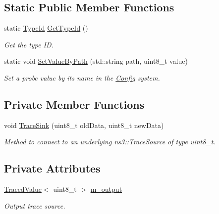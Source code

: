 \subsection*{Static Public Member Functions}
\begin{DoxyCompactItemize}
\item 
static \hyperlink{classns3_1_1TypeId}{Type\+Id} \hyperlink{classns3_1_1Uinteger8Probe_a514e92b16bae5c529857dbae57ec3142}{Get\+Type\+Id} ()
\begin{DoxyCompactList}\small\item\em Get the type ID. \end{DoxyCompactList}\item 
static void \hyperlink{classns3_1_1Uinteger8Probe_a5126f87223a1836fd0d63a71e9c88f7b}{Set\+Value\+By\+Path} (std\+::string path, uint8\+\_\+t value)
\begin{DoxyCompactList}\small\item\em Set a probe value by its name in the \hyperlink{namespacens3_1_1Config}{Config} system. \end{DoxyCompactList}\end{DoxyCompactItemize}
\subsection*{Private Member Functions}
\begin{DoxyCompactItemize}
\item 
void \hyperlink{classns3_1_1Uinteger8Probe_a99700b6a54ea9f2c672668a7fac53cfb}{Trace\+Sink} (uint8\+\_\+t old\+Data, uint8\+\_\+t new\+Data)
\begin{DoxyCompactList}\small\item\em Method to connect to an underlying ns3\+::\+Trace\+Source of type uint8\+\_\+t. \end{DoxyCompactList}\end{DoxyCompactItemize}
\subsection*{Private Attributes}
\begin{DoxyCompactItemize}
\item 
\hyperlink{classns3_1_1TracedValue}{Traced\+Value}$<$ uint8\+\_\+t $>$ \hyperlink{classns3_1_1Uinteger8Probe_a9e98d1957a6f12336a105bb017a2f6a1}{m\+\_\+output}
\begin{DoxyCompactList}\small\item\em Output trace source. \end{DoxyCompactList}\end{DoxyCompactItemize}
